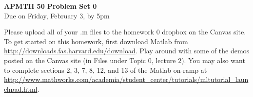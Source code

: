 \documentclass[12pt]{article}
\begin{document}
\begin{center}{\Large \bf{APMTH 50 Problem Set 0}} \vspace{0.2in}\\
{\large Due on Friday, February 3, by 5pm\\}
\end{center}

\noindent Please upload all of your .m files to the homework 0 dropbox on the Canvas site.\\

\noindent To get started on this homework, first download Matlab from \url{http://downloads.fas.harvard.edu/download}.  Play around with some of the demos posted on the Canvas site (in Files under Topic 0, lecture 2).  You may also want to complete sections 2, 3, 7, 8, 12, and 13 of the Matlab on-ramp at  \url{http://www.mathworks.com/academia/student_center/tutorials/mltutorial_launchpad.html}.
\end{document}
